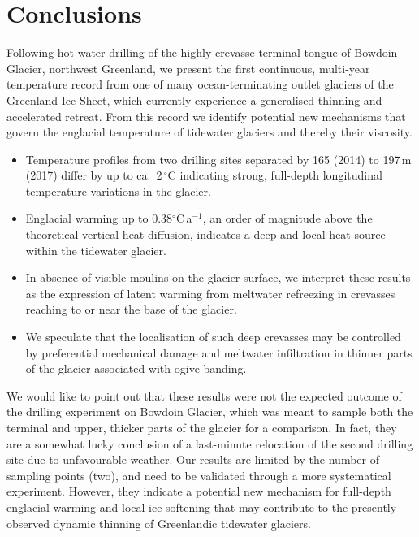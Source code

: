 \documentclass[utf8]{article}
\begin{document}
\section{Conclusions}

    Following hot water drilling of the highly crevasse terminal tongue of
    Bowdoin Glacier, northwest Greenland, we present the first continuous,
    multi-year temperature record from one of many ocean-terminating outlet
    glaciers of the Greenland Ice Sheet, which currently experience a
    generalised thinning and accelerated retreat. From this record we identify
    potential new mechanisms that govern the englacial temperature of tidewater
    glaciers and thereby their viscosity.

    \begin{itemize}

      \item Temperature profiles from two drilling sites separated by 165
        (2014) to 197\,m (2017) differ by up to ca.~2\,$^\circ$C indicating
        strong, full-depth longitudinal temperature variations in the glacier.

      \item Englacial warming up to 0.38$^\circ$C\,a$^{-1}$, an order of
        magnitude above the theoretical vertical heat diffusion, indicates a
        deep and local heat source within the tidewater glacier.

      \item In absence of visible moulins on the glacier surface, we interpret
        these results as the expression of latent warming from meltwater
        refreezing in crevasses reaching to or near the base of the glacier.

      \item We speculate that the localisation of such deep crevasses may be
        controlled by preferential mechanical damage and meltwater infiltration
        in thinner parts of the glacier associated with ogive banding.

    \end{itemize}

    We would like to point out that these results were not the expected outcome
    of the drilling experiment on Bowdoin Glacier, which was meant to sample
    both the terminal and upper, thicker parts of the glacier for a comparison.
    In fact, they are a somewhat lucky conclusion of a last-minute relocation
    of the second drilling site due to unfavourable weather.
    Our results are limited by the number of sampling points (two), and need to
    be validated through a more systematical experiment. However, they indicate
    a potential new mechanism for full-depth englacial warming and local
    ice softening that may contribute to the presently observed dynamic
    thinning of Greenlandic tidewater glaciers.
\end{document}
